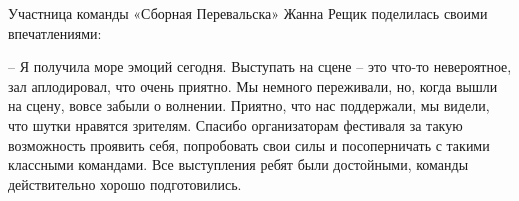 Участница команды «Сборная Перевальска» Жанна Рещик поделилась своими
впечатлениями:

– Я получила море эмоций сегодня. Выступать на сцене – это что-то невероятное,
зал аплодировал, что очень приятно. Мы немного переживали, но, когда вышли на
сцену, вовсе забыли о волнении. Приятно, что нас поддержали, мы видели, что
шутки нравятся зрителям. Спасибо организаторам фестиваля за такую возможность
проявить себя, попробовать свои силы и посоперничать с такими классными
командами. Все выступления ребят были достойными, команды действительно хорошо
подготовились.

